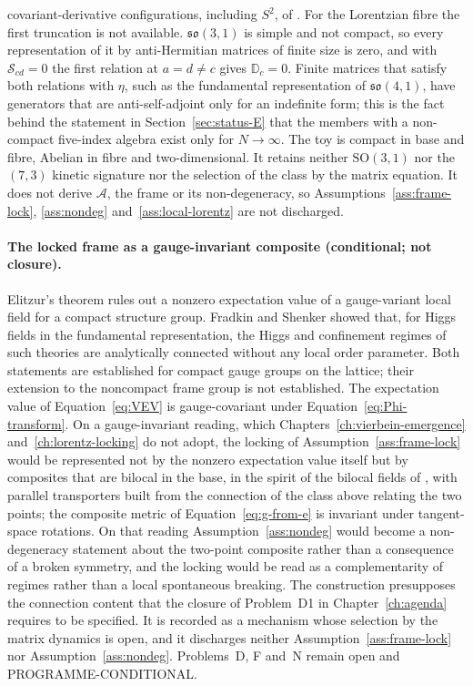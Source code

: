 covariant-derivative configurations, including \(S^2\), of \cite{HattoriSekoTsuchiya2026}. For the Lorentzian fibre the first truncation is not available. \(\mathfrak{so}(3,1)\) is simple and not compact, so every representation of it by anti-Hermitian matrices of finite size is zero, and with \(\mathcal S_{cd}=0\) the first relation at \(a=d\neq c\) gives \(\mathbb D_c=0\). Finite matrices that satisfy both relations with \(\eta\), such as the fundamental representation of \(\mathfrak{so}(4,1)\), have generators that are anti-self-adjoint only for an indefinite form; this is the fact behind the statement in Section~\ref{sec:status-E} that the members with a non-compact five-index algebra exist only for \(N\to\infty\). The toy is compact in base and fibre, Abelian in fibre and two-dimensional. It retains neither \(\mathrm{SO}(3,1)\) nor the \((7,3)\) kinetic signature nor the selection of the class by the matrix equation. It does not derive \(\mathcal A\), the frame or its non-degeneracy, so Assumptions~\ref{ass:frame-lock}, \ref{ass:nondeg} and~\ref{ass:local-lorentz} are not discharged.

\paragraph{The locked frame as a gauge-invariant composite (conditional; not closure).}
Elitzur's theorem \cite{Elitzur1975} rules out a nonzero expectation value of a gauge-variant local field for a compact structure group. Fradkin and Shenker \cite{FradkinShenker1979} showed that, for Higgs fields in the fundamental representation, the Higgs and confinement regimes of such theories are analytically connected without any local order parameter. Both statements are established for compact gauge groups on the lattice; their extension to the noncompact frame group is not established. The expectation value of Equation~\eqref{eq:VEV} is gauge-covariant under Equation~\eqref{eq:Phi-transform}. On a gauge-invariant reading, which Chapters~\ref{ch:vierbein-emergence} and~\ref{ch:lorentz-locking} do not adopt, the locking of Assumption~\ref{ass:frame-lock} would be represented not by the nonzero expectation value itself but by composites that are bilocal in the base, in the spirit of the bilocal fields of \cite{HoKawaiSteinacker2025}, with parallel transporters built from the connection of the class above relating the two points; the composite metric of Equation~\eqref{eq:g-from-e} is invariant under tangent-space rotations. On that reading Assumption~\ref{ass:nondeg} would become a non-degeneracy statement about the two-point composite rather than a consequence of a broken symmetry, and the locking would be read as a complementarity of regimes rather than a local spontaneous breaking. The construction presupposes the connection content that the closure of Problem~D1 in Chapter~\ref{ch:agenda} requires to be specified. It is recorded as a mechanism whose selection by the matrix dynamics is open, and it discharges neither Assumption~\ref{ass:frame-lock} nor Assumption~\ref{ass:nondeg}. Problems~D, F and~N remain open and PROGRAMME-CONDITIONAL.
